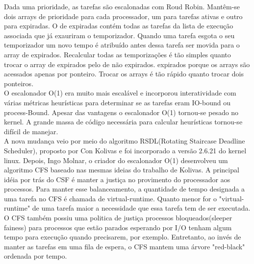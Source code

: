 \documentclass[conference]{IEEEtran}
\begin{document}
Dada uma prioridade, as tarefas são escalonadas com Roud Robin. Mantêm-se dois arrays de prioridade para cada processador, um para tarefas ativas e outro para expiradas. O de expiradas contém todas as tarefas da lista de execução associada que já exauriram o temporizador. Quando uma tarefa esgota o seu temporizador um novo tempo é atribuído antes dessa tarefa ser movida para o array de expirados. Recalcular todas as temporizações é tão simples quanto trocar o array de expirados pelo de não expirados. expirados porque os arrays são acessados apenas por ponteiro. Trocar os arrays é tão rápido quanto trocar dois ponteiros\cite{LinuxSchedulerMIT}.\\

O escalonador O(1) era muito mais escalável e incorporou interatividade com várias métricas heurísticas para determinar se as tarefas eram IO-bound ou process-Bound. Apesar das vantagens o escalonador O(1) tornou-se pesado no kernel. A grande massa de código necessária para calcular heurísticas tornou-se difícil de manejar.\\

A nova mudança veio por meio do algoritmo RSDL(Rotating Staircase Deadline Scheduler), proposto por Con Kolivas e foi incorporado a versão 2.6.21 do kernel linux. Depois, Ingo Molnar, o criador do escalonador O(1) desenvolveu um algoritmo CFS baseado nas mesmas ideias do trabalho de Kolivas. A principal idéia por trás do CSF é manter a justiça no provimento do processador aos processos. Para manter esse balanceamento, a quantidade de tempo designada a uma tarefa no CFS é chamada de virtual-runtime. Quanto menor for o "virtual-runtime" de uma tarefa maior a necessidade que essa tarefa tem de ser executada.\\
 
O CFS também possiu uma politica de justiça processos bloqueados(sleeper fainess) para processos que estão parados esperando por I/O tenham algum tempo para execução quando precisarem, por exemplo. Entretanto, ao invés de manter as tarefas em uma fila de espera, o CFS mantem uma árvore "red-black" ordenada por tempo.\\
\end{document}
